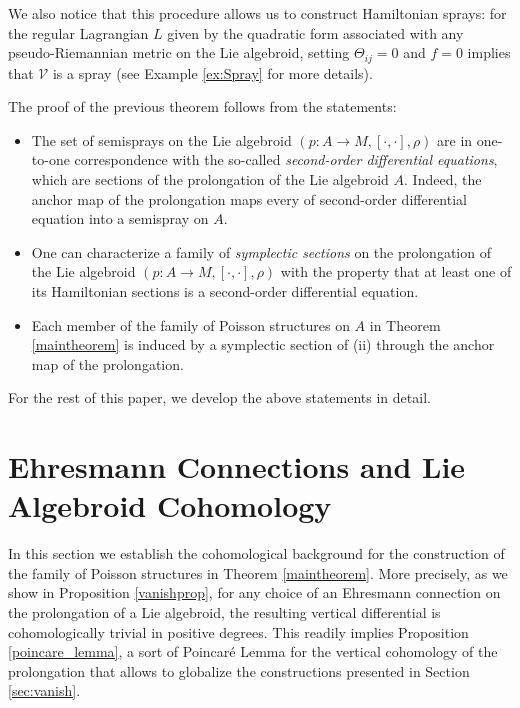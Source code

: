 \documentclass[12pt,letterpaper]{article}
\numberwithin{equation}{section}
\begin{document}
We also notice that this procedure allows us to construct Hamiltonian sprays:
for the regular Lagrangian $L$ given by the quadratic form associated with any pseudo-Riemannian metric on the Lie algebroid,
setting $\Theta_{ij}=0$ and $f=0$ implies that $\mathcal{V}$ is a spray
(see Example \ref{ex:Spray} for more details).


The proof of the previous theorem follows from the statements:

\begin{itemize}

\item[(i)]  The set of semisprays on the Lie algebroid $(p: A \rightarrow M, [ \cdot, \cdot ], \rho)$ 
are in one-to-one correspondence with the so-called \emph{second-order differential equations}, 
which are sections of the prolongation of the Lie algebroid $A$.
Indeed, the anchor map of the prolongation maps every of second-order differential equation into a semispray on $A$.

\item[(ii)] One can characterize a family of \emph{symplectic sections} on the prolongation of the Lie algebroid  $(p: A \rightarrow M, [ \cdot, \cdot ], \rho)$ 
with the property that at least one of its Hamiltonian sections is a second-order differential equation. 

\item[(iii)]  Each member of the family of Poisson structures on $A$ in Theorem \ref{maintheorem} 
is induced by a symplectic section of (ii) through the anchor map of the prolongation.
\end{itemize}

For the rest of this paper, we develop the above statements in detail.


\section{Ehresmann Connections and Lie Algebroid Cohomology}\label{sec4}

In this section we establish the cohomological background for the construction of
the family of Poisson structures in Theorem \ref{maintheorem}.
More precisely, as we show in Proposition \ref{vanishprop}, 
for any choice of an Ehresmann connection on the prolongation of a Lie algebroid,
the resulting vertical differential is cohomologically trivial in positive degrees.
This readily implies Proposition \ref{poincare_lemma}, a sort of Poincaré Lemma for the vertical cohomology of the prolongation
that allows to globalize the constructions presented in Section \ref{sec:vanish}.
\end{document}
